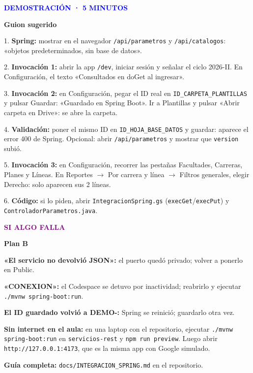 \documentclass[11pt,a4paper]{article}
\newcommand{\paso}[4]{\begin{tcolorbox}[colback=#1!5!white,colframe=#1!40!white,boxrule=0.5pt,arc=2mm,left=3mm,right=3mm,top=2mm,bottom=2mm,before upper=\raggedright]\textcolor{#1}{\textbf{#2}}\par\textbf{#3}\par #4\end{tcolorbox}}
\newcommand{\nota}[2]{\begin{tcolorbox}[colback=amber!8!white,colframe=amber!40!white,boxrule=0.5pt,arc=2mm,before upper=\raggedright]\textcolor{amber}{\textbf{#1}} #2\end{tcolorbox}}
\newcommand{\cod}[1]{\texttt{#1}}
\begin{document}
\paso{blue}{DEMOSTRACIÓN · 5 MINUTOS}{Guion sugerido}{
1. \textbf{Spring:} mostrar en el navegador \cod{/api/parametros} y \cod{/api/catalogos}: «objetos predeterminados, sin base de datos».\par
2. \textbf{Invocación 1:} abrir la app \cod{/dev}, iniciar sesión y señalar el ciclo 2026-II. En Configuración, el texto «Consultados en doGet al ingresar».\par
3. \textbf{Invocación 2:} en Configuración, pegar el ID real en \cod{ID\_CARPETA\_PLANTILLAS} y pulsar Guardar: «Guardado en Spring Boot». Ir a Plantillas y pulsar «Abrir carpeta en Drive»: se abre la carpeta.\par
4. \textbf{Validación:} poner el mismo ID en \cod{ID\_HOJA\_BASE\_DATOS} y guardar: aparece el error 400 de Spring. Opcional: abrir \cod{/api/parametros} y mostrar que \cod{version} subió.\par
5. \textbf{Invocación 3:} en Configuración, recorrer las pestañas Facultades, Carreras, Planes y Líneas. En Reportes $\rightarrow$ Por carrera y línea $\rightarrow$ Filtros generales, elegir Derecho: solo aparecen sus 2 líneas.\par
6. \textbf{Código:} si lo piden, abrir \cod{IntegracionSpring.gs} (\cod{execGet}/\cod{execPut}) y \cod{ControladorParametros.java}.}

\paso{purple}{SI ALGO FALLA}{Plan B}{
\textbf{«El servicio no devolvió JSON»:} el puerto quedó privado; volver a ponerlo en Public.\par
\textbf{«CONEXION»:} el Codespace se detuvo por inactividad; reabrirlo y ejecutar \cod{./mvnw spring-boot:run}.\par
\textbf{El ID guardado volvió a DEMO-:} Spring se reinició; guardarlo otra vez.\par
\textbf{Sin internet en el aula:} en una laptop con el repositorio, ejecutar \cod{./mvnw spring-boot:run} en \cod{servicios-rest} y \cod{npm run preview}. Luego abrir \cod{http://127.0.0.1:4173}, que es la misma app con Google simulado.}

\nota{Guía completa:}{\cod{docs/INTEGRACION\_SPRING.md} en el repositorio.}
\end{document}
